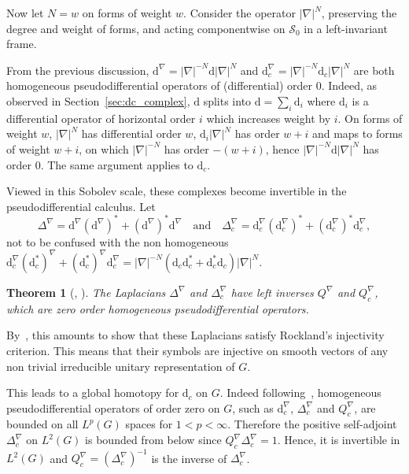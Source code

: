 \documentclass[11pt]{article}
\newtheorem{theo}{Theorem}[section]
\theoremstyle{definition}
\numberwithin{equation}{section}
\numberwithin{figure}{section}
\numberwithin{table}{section}
\newcommand*\calS{\mathcal{S}}
\newcommand{\dd}{\mathrm{d}}
\begin{document}

Now let $N=w$ on forms of weight $w$. Consider the operator $|\nabla|^N$, preserving the degree and weight of forms, and acting componentwise on $\calS_0$ in a left-invariant frame.

From the previous discussion, $\dd^{\nabla} = |\nabla|^{-N} \dd |\nabla|^N$ and $\dd_c^{\nabla} = |\nabla|^{-N} \dd_c |\nabla|^N$ are both homogeneous pseudodifferential operators of (differential) order $0$. Indeed, as observed in Section~\ref{sec:dc_complex}, $\dd$ splits into $\dd=\sum_i \dd_i$ where $\dd_i$ is a differential operator of horizontal order $i$ which increases weight by $i$. On forms of weight $w$, $|\nabla|^N$ has differential order $w$, $\dd_i |\nabla|^N$ has order $w+i$ and maps to forms of weight $w+i$, on which $ |\nabla|^{-N}$ has order $-(w+i)$, hence $|\nabla|^{-N} \dd |\nabla|^N$ has order $0$. The same argument applies to $\dd_c$.

Viewed in this Sobolev scale, these complexes become invertible in the pseudodifferential calculus. Let
\[
\Delta^{\nabla } = \dd^{\nabla} (\dd^{\nabla})^* + (\dd^{\nabla})^* \dd^\nabla
\quad \mathrm{and} \quad \Delta_c^{\nabla} = \dd_c^{\nabla} (\dd_c^{\nabla})^* + (\dd_c^{\nabla})^* \dd_c^\nabla,
\]
not to be confused with the non homogeneous $\dd_c^{\nabla} (\dd_c^*)^{\nabla} + (\dd_c^*)^{\nabla} \dd_c^{\nabla} = |\nabla|^{-N} (\dd_c \dd_c^* + \dd_c^* \dd_c) |\nabla|^N$.

\begin{theo}[{\cite[Theorem~3]{Rumin_CRAS_1999}, \cite[Theorem~5.2]{Rumin_TSG}}]\label{thm:left_inverse}
The Laplacians $\Delta^{\nabla} $ and $\Delta_c^{\nabla } $ have left inverses $Q^{\nabla}$ and $Q_c^{\nabla}$, which are zero order homogeneous pseudodifferential operators.
\end{theo}

By~\cite[Theorem~6.2]{CGGP}, this amounts to show that these Laplacians satisfy Rockland's injectivity criterion. This means that their symbols are injective on smooth vectors of any non trivial irreducible unitary representation of $G$.

This leads to a global homotopy for $\dd_c$ on $G$. Indeed following~\cite[Proposition~1.9]{Folland_1975}, homogeneous pseudodifferential operators of order zero on $G$, such as $\dd_c^{\nabla}$, $\Delta_c^\nabla$ and $Q_c^{\nabla}$, are bounded on all $L^p(G)$ spaces for $1< p< \infty$. Therefore the positive self-adjoint $\Delta_c^{\nabla }$ on $L^2(G)$ is bounded from below since $Q_c^{\nabla} \Delta_c^{\nabla} = 1$. Hence, it is invertible in $L^2(G)$ and $Q_c^{\nabla} = (\Delta_c^{\nabla})^{-1}$ is the inverse of $\Delta_c^{\nabla}$.
\end{document}
